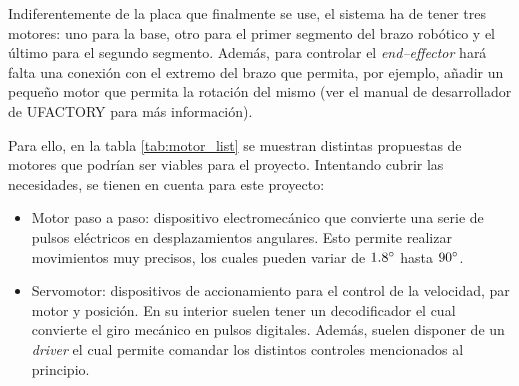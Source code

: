 Indiferentemente de la placa que finalmente se use, el sistema ha de tener tres motores: uno para la base, otro para el primer segmento del brazo robótico y el último para el segundo segmento. Además, para controlar el \textit{end--effector} hará falta una conexión con el extremo del brazo que permita, por ejemplo, añadir un pequeño motor que permita la rotación del mismo (ver el manual de desarrollador de UFACTORY para más información).

Para ello, en la tabla \ref{tab:motor_list} se muestran distintas propuestas de motores que podrían ser viables para el proyecto. Intentando cubrir las necesidades, se tienen en cuenta para este proyecto:

\begin{itemize}
    \item Motor paso a paso: dispositivo electromecánico que convierte una serie de pulsos eléctricos en desplazamientos angulares. Esto permite realizar movimientos muy precisos, los cuales pueden variar de $1.8\degree$ hasta $90\degree$.
    \item Servomotor: dispositivos de accionamiento para el control de la velocidad, par motor y posición. En su interior suelen tener un decodificador el cual convierte el giro mecánico en pulsos digitales. Además, suelen disponer de un \textit{driver} el cual permite comandar los distintos controles mencionados al principio.
\end{itemize}


